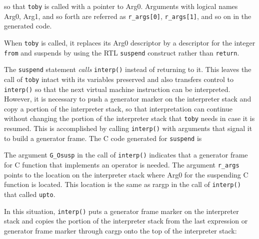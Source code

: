 \noindent so that \texttt{toby} is called with a pointer to
Arg0. Arguments with logical names Arg0, Arg1, and so forth are
referred as \texttt{r\_args[0]}, \texttt{r\_args[1]}, and so on in the
generated code.

When \texttt{toby} is called, it replaces its Arg0 descriptor by a
descriptor for the integer \texttt{from} and suspends by using the RTL
\texttt{suspend} construct rather than \texttt{return}.

The \texttt{suspend} statement \textit{calls }\texttt{interp()}
instead of returning to it. This leaves the call of \texttt{toby}
intact with its variables preserved and also transfers control to
\texttt{interp()} so that the next virtual machine instruction can be
interpreted. However, it is necessary to push a generator marker on
the interpreter stack and copy a portion of the interpreter stack, so
that interpretation can continue without changing the portion of the
interpreter stack that \texttt{toby} needs in case it is resumed. This
is accomplished by calling \texttt{interp()} with arguments that
signal it to build a generator frame. The C code generated for
\texttt{suspend} is

\goodbreak
{}

The argument \texttt{G\_Osusp} in the call of \texttt{interp()}
indicates that a generator frame for C function that implements an
operator is needed. The argument \texttt{r\_args} points to the
location on the interpreter stack where Arg0 for the suspending C
function is located. This location is the same as rargp in the call of
\texttt{interp()} that called \texttt{upto}.

In this situation, \texttt{interp()} puts a generator frame marker on
the interpreter stack and copies the portion of the interpreter stack
from the last expression or generator frame marker through cargp onto
the top of the interpreter stack:

